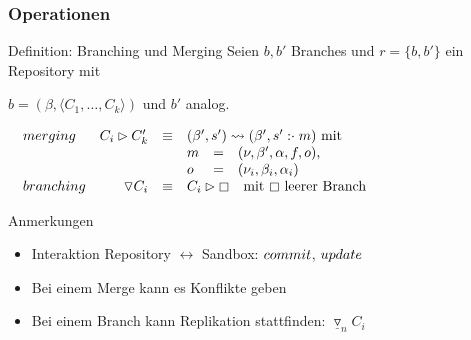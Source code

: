 \documentclass[german, presentation]{beamer}
\begin{document}
\begin{frame}
  \frametitle{Operationen}

  \begin{block}{Definition: Branching und Merging}
    \medskip
    \hspace{1em}Seien $b, b'$ Branches und $r=\{b, b'\}$ ein Repository mit

    \hspace{1em}$b=(\beta, \langle C_1, \ldots, C_k\rangle)$ und $b'$ analog.
    \medskip

    $\begin{array}{@{\hspace{1em}}lrcl}
    \STRUCT{merging}      & C_i \rhd C_k'              & \equiv &
    (\beta', s') \leadsto
    (\beta', s'\APPEND m)\ \NORMAL{mit} \\
                          &                            &        &
                          \begin{array}{@{}lcl}
                          m   &=& (\nu, \beta', \alpha, f, o), \\
                          o   &=& (\nu_i, \beta_i, \alpha_i) \\
                          \end{array} \\
    \STRUCT{branching}    & \triangledown C_i          & \equiv &
    C_i\rhd \boxempty \quad \NORMAL{mit $\boxempty$ leerer Branch}
%
%
    \end{array}$
  \end{block}

  \begin{block}{Anmerkungen}
    \begin{itemize}
    \item Interaktion Repository $\leftrightarrow$ Sandbox:
      $\mathnormal{commit}$, $\mathnormal{update}$
    \item Bei einem Merge kann es Konflikte geben
    \item Bei einem Branch kann Replikation stattfinden:
      $\underline\triangledown_nC_i$
    \end{itemize}
  \end{block}
\end{frame}
\end{document}
